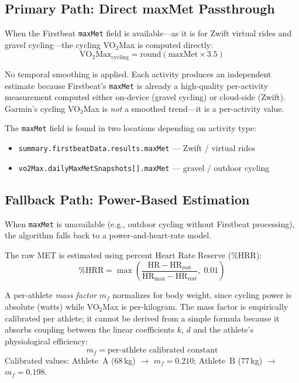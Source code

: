 \documentclass[11pt,a4paper]{article}
\begin{document}
\subsection{Primary Path: Direct maxMet Passthrough}

When the Firstbeat \texttt{maxMet} field is available---as it is for Zwift virtual rides and gravel cycling---the cycling VO$_2$Max is computed directly:
\begin{equation}
\text{VO}_2\text{Max}_{\text{cycling}} = \text{round}(\text{maxMet} \times 3.5)
\label{eq:cycling-maxmet}
\end{equation}

No temporal smoothing is applied.
Each activity produces an independent estimate because Firstbeat's \texttt{maxMet} is already a high-quality per-activity measurement computed either on-device (gravel cycling) or cloud-side (Zwift).
Garmin's cycling VO$_2$Max is \emph{not} a smoothed trend---it is a per-activity value.

The \texttt{maxMet} field is found in two locations depending on activity type:
\begin{itemize}[nosep]
    \item \texttt{summary.firstbeatData.results.maxMet} --- Zwift / virtual rides
    \item \texttt{vo2Max.dailyMaxMetSnapshots[].maxMet} --- gravel / outdoor cycling
\end{itemize}

\subsection{Fallback Path: Power-Based Estimation}
\label{sec:cycling-fallback}

When \texttt{maxMet} is unavailable (e.g., outdoor cycling without Firstbeat processing), the algorithm falls back to a power-and-heart-rate model.

The raw MET is estimated using percent Heart Rate Reserve (\%HRR):
\begin{equation}
\%\text{HRR} = \max\!\left(\frac{\text{HR} - \text{HR}_{\text{rest}}}{\text{HR}_{\text{max}} - \text{HR}_{\text{rest}}},\; 0.01\right)
\label{eq:pcthrr}
\end{equation}

A per-athlete \emph{mass factor} $m_f$ normalizes for body weight, since cycling power is absolute (watts) while VO$_2$Max is per-kilogram.
The mass factor is empirically calibrated per athlete; it cannot be derived from a simple formula because it absorbs coupling between the linear coefficients $k$, $d$ and the athlete's physiological efficiency:
\begin{equation}
m_f = \text{per-athlete calibrated constant}
\label{eq:mass-factor}
\end{equation}
Calibrated values: Athlete~A ($68$\,kg) $\to$ $m_f = 0.210$; Athlete~B ($77$\,kg) $\to$ $m_f = 0.198$.
\end{document}
